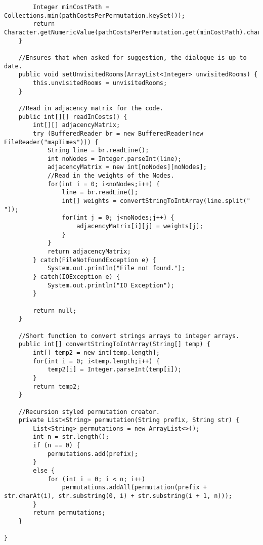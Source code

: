 \begin{lstlisting}
		Integer minCostPath = Collections.min(pathCostsPerPermutation.keySet());
		return Character.getNumericValue(pathCostsPerPermutation.get(minCostPath).charAt(1));
	}

	//Ensures that when asked for suggestion, the dialogue is up to date.
	public void setUnvisitedRooms(ArrayList<Integer> unvisitedRooms) {
		this.unvisitedRooms = unvisitedRooms;
	}

	//Read in adjacency matrix for the code.
	public int[][] readInCosts() {
		int[][] adjacencyMatrix;
		try (BufferedReader br = new BufferedReader(new FileReader("mapTimes"))) {
		    String line = br.readLine();
		    int noNodes = Integer.parseInt(line);
		    adjacencyMatrix = new int[noNodes][noNodes];
		    //Read in the weights of the Nodes.
		    for(int i = 0; i<noNodes;i++) {
		    	line = br.readLine();
		    	int[] weights = convertStringToIntArray(line.split(" "));
		    	for(int j = 0; j<noNodes;j++) {
		    		adjacencyMatrix[i][j] = weights[j];
		    	}
		    }
		    return adjacencyMatrix;
		} catch(FileNotFoundException e) {
			System.out.println("File not found.");
		} catch(IOException e) {
			System.out.println("IO Exception");
		}

		return null;
	}

	//Short function to convert strings arrays to integer arrays.
	public int[] convertStringToIntArray(String[] temp) {
		int[] temp2 = new int[temp.length];
		for(int i = 0; i<temp.length;i++) {
			temp2[i] = Integer.parseInt(temp[i]);
		}
		return temp2;
	}

	//Recursion styled permutation creator.
	private List<String> permutation(String prefix, String str) {
	    List<String> permutations = new ArrayList<>();
	    int n = str.length();
	    if (n == 0) {
	        permutations.add(prefix);
	    }
	    else {
	        for (int i = 0; i < n; i++)
	            permutations.addAll(permutation(prefix + str.charAt(i), str.substring(0, i) + str.substring(i + 1, n)));
	    }
	    return permutations;
	}

}
\end{lstlisting}
